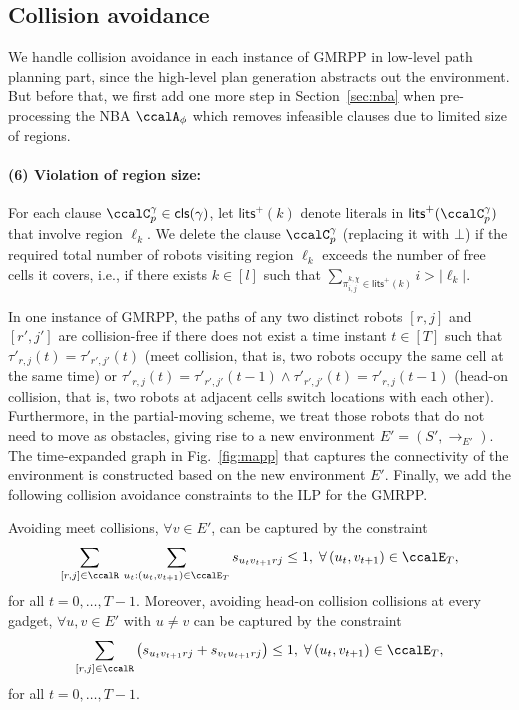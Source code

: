 \documentclass[Afour,sageh,times]{sagej}
\newcommand{\clause}[1]{\mathsf{cls}(#1)}
\newcommand{\cp}[2]{\ccalC_{#1}^{#2}}
\newcommand{\autop}{\ccalA_{\phi}}
\renewcommand{\ap}[3]{\mathcal{\pi}_{{#1},{#2}}^{#3}}
\begin{document}
{{ \subsection{Collision avoidance}\label{sec:extension_collision}
We handle collision avoidance in each instance of GMRPP in low-level path planning part,  since the high-level plan generation abstracts out the environment.  But before that, we first add one more step in Section~\ref{sec:nba} when pre-processing the NBA $\autop$ which removes infeasible clauses due to limited size of regions.
\paragraph{(6) Violation of region size:} \label{prune:violation2} For each clause $\cp{p}{\gamma} \in \clause{\gamma}$, let $\mathsf{lits}^+(k)$ denote literals in $\mathsf{lits}^+(\cp{p}{\gamma})$ that involve region $\ell_{k}$. We delete the clause $\cp{p}{\gamma}$ (replacing it with $\bot$) if the required total number of robots  visiting region $\ell_{k}$ exceeds the number of free cells it covers, i.e., if there exists $k\in[l]$ such that $ \sum_{\ap{i}{j}{k,\chi}\in\mathsf{lits}^+(k)}   i > |\ell_k|$.

In one instance of GMRPP, the paths of  any two distinct robots $[r,j]$ and $[r', j']$ are collision-free if there does not exist  a time instant $t \in [T]$ such that $\tau'_{r,j}(t) = \tau'_{r',j'}(t)$ (meet collision, that is, two robots occupy the same cell at the same time) or  $\tau'_{r,j}(t) = \tau'_{r',j'}(t-1) \wedge \tau'_{r',j'}(t) = \tau'_{r,j}(t-1)$ (head-on collision, that is, two robots at adjacent cells switch locations with each other). Furthermore, in the partial-moving scheme, we treat those robots that do not need to move  as obstacles, giving rise to a new environment $E'=(S', \to_{E'})$. The time-expanded graph in Fig.~\ref{fig:mapp} that captures the connectivity of the environment is constructed based on the new environment $E'$. Finally, we add the following collision avoidance constraints to the ILP for the GMRPP.

Avoiding meet collisions,  $\forall v \in E'$, can be captured by the constraint
\begingroup\makeatletter\def\f@size{10}\check@mathfonts
\def\maketag@@@#1{\hbox{\m@th\normalsize\normalfont#1}}%
\begin{align}\label{eq:meet}
 \sum_{[r,j]\in\ccalR}  \, \sum_{u_t: (u_t, v_{t+1}) \in \ccalE_T} s_{u_t v_{t+1} r j } \leq 1,  \; \forall \,(u_t, v_{t+1}) \in \ccalE_T,
\end{align}
\endgroup
for all $t=0,\ldots,T-1$. Moreover, avoiding head-on collision collisions at every  gadget, $\forall u, v \in E'$ with $u\not= v$ can be captured by the constraint
\begingroup\makeatletter\def\f@size{10}\check@mathfonts
\def\maketag@@@#1{\hbox{\m@th\normalsize\normalfont#1}}%
\begingroup
\begin{align}\label{eq:headon}
 \sum_{[r,j]\in \ccalR} \left( s_{u_t v_{t+1} r j } + s_{v_t u_{t+1} r j } \right) \leq 1, \; \forall \,(u_t, v_{t+1}) \in \ccalE_T,
\end{align}
\endgroup
for all $t=0,\ldots,T-1$.

}}
\end{document}
